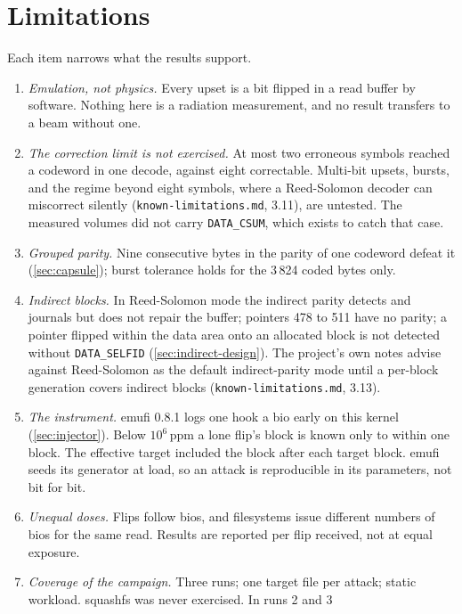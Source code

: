 \section{Limitations}\label{sec:limits}

Each item narrows what the results support.

\begin{enumerate}
\item \emph{Emulation, not physics.} Every upset is a bit flipped in a
  read buffer by software. Nothing here is a radiation measurement, and
  no result transfers to a beam without one.
\item \emph{The correction limit is not exercised.} At most two
  erroneous symbols reached a codeword in one decode, against eight
  correctable. Multi-bit upsets, bursts, and the regime beyond eight
  symbols, where a Reed-Solomon decoder can miscorrect silently
  (\texttt{known-limitations.md}, 3.11), are untested. The measured
  volumes did not carry \texttt{DATA\_CSUM}, which exists to catch
  that case.
\item \emph{Grouped parity.} Nine consecutive bytes in the parity of one
  codeword defeat it (\cref{sec:capsule}); burst tolerance holds for the
  3\,824 coded bytes only.
\item\label{lim:indirect} \emph{Indirect blocks.} In Reed-Solomon mode the indirect parity
  detects and journals but does not repair the buffer; pointers 478 to
  511 have no parity; a pointer flipped within the data area onto an
  allocated block is not detected without \texttt{DATA\_SELFID}
  (\cref{sec:indirect-design}). The project's own notes advise against
  Reed-Solomon as the default indirect-parity mode until a per-block
  generation covers indirect blocks (\texttt{known-limitations.md},
  3.13).
\item \emph{The instrument.} emufi 0.8.1 logs one hook a bio early on
  this kernel (\cref{sec:injector}). Below $10^{6}$\,ppm a lone flip's
  block is known only to within one block. The effective target
  included the block after each target block. emufi seeds its generator
  at load, so an attack is reproducible in its parameters, not bit for
  bit.
\item \emph{Unequal doses.} Flips follow bios, and filesystems issue
  different numbers of bios for the same read. Results are reported per
  flip received, not at equal exposure.
\item \emph{Coverage of the campaign.} Three runs; one target file per
  attack; static workload. squashfs was never exercised. In runs 2 and 3

\end{enumerate}
